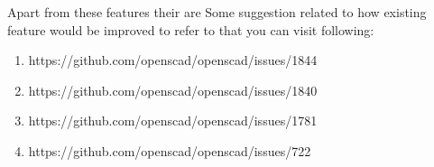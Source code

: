 Apart from these features their are Some suggestion related to how existing feature would be improved to refer to that you can visit following: 

\begin{enumerate}
	\item https://github.com/openscad/openscad/issues/1844
	\item https://github.com/openscad/openscad/issues/1840
	\item https://github.com/openscad/openscad/issues/1781
	\item https://github.com/openscad/openscad/issues/722
\end{enumerate} 
